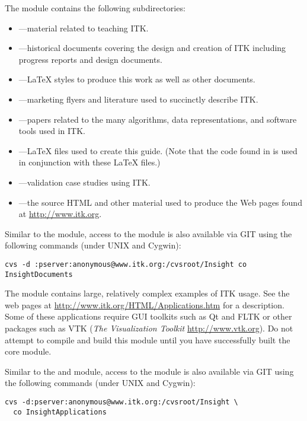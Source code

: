 The  module contains the following subdirectories:
\begin{itemize}
        \item {}---material related to
        teaching ITK.
        \item {}---historical documents covering
        the design and creation of ITK including progress reports and 
        design documents.
        \item {}---\LaTeX{} styles to produce this
        work as well as other documents.
        \item {}---marketing flyers and 
        literature used to succinctly describe ITK.
        \item {}---papers related to the many
        algorithms, data representations, and software tools used in ITK.
        \item {}---\LaTeX{} files used to
        create this guide. (Note that the code found in
         is used in conjunction with these \LaTeX{}
        files.)
        \item {}---validation case studies
        using ITK.
        \item {}---the source HTML and other material
        used to produce the Web pages found at \url{http://www.itk.org}.
\end{itemize}

Similar to the  module, access to the 
module is also available via GIT using the following commands (under UNIX and
Cygwin):
\begin{verbatim}
cvs -d :pserver:anonymous@www.itk.org:/cvsroot/Insight co InsightDocuments
\end{verbatim}

The  module contains large, relatively complex
examples of ITK usage. See the web pages at 
\url{http://www.itk.org/HTML/Applications.htm} for a description. Some of 
these applications require GUI toolkits such as Qt and FLTK or other packages
such as VTK (\emph{The Visualization Toolkit}
\url{http://www.vtk.org}). Do not attempt to compile and build this module
until you have successfully built the core  module.

Similar to the  and  module, access to 
the  module is also available via GIT using the 
following commands (under UNIX and Cygwin):
\begin{verbatim}
cvs -d:pserver:anonymous@www.itk.org:/cvsroot/Insight \ 
  co InsightApplications
\end{verbatim}

